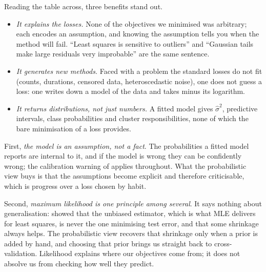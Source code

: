 \noindent
Reading the table across, three benefits stand out.
\begin{itemize}
    \item \emph{It explains the losses.} None of the objectives we minimised was
    arbitrary; each encodes an assumption, and knowing the assumption tells you when
    the method will fail. ``Least squares is sensitive to outliers'' and ``Gaussian
    tails make large residuals very improbable'' are the same sentence.
    \item \emph{It generates new methods.} Faced with a problem the standard losses do
    not fit (counts, durations, censored data, heteroscedastic noise), one does not
    guess a loss: one writes down a model of the data and takes minus its logarithm.
    \item \emph{It returns distributions, not just numbers.} A fitted model gives
    $\hat\sigma^2$, predictive intervals, class probabilities and cluster
    responsibilities, none of which the bare minimisation of a loss provides.
\end{itemize}

\begin{remark}
First, \emph{the model is an assumption, not a fact}. The probabilities a fitted model
reports are internal to it, and if the model is wrong they can be confidently wrong; the
calibration warning of  applies throughout. What the
probabilistic view buys is that the assumptions become explicit and therefore
criticisable, which is progress over a loss chosen by habit.

Second, \emph{maximum likelihood is one principle among several}. It says nothing about
generalisation:  showed that the unbiased estimator, which is
what MLE delivers for least squares, is never the one minimising test error, and that
some shrinkage always helps. The probabilistic view recovers that shrinkage only when a
prior is added by hand, and choosing that prior brings us straight back to
cross-validation. Likelihood explains where our objectives come from; it does not
absolve us from checking how well they predict.
\end{remark}
